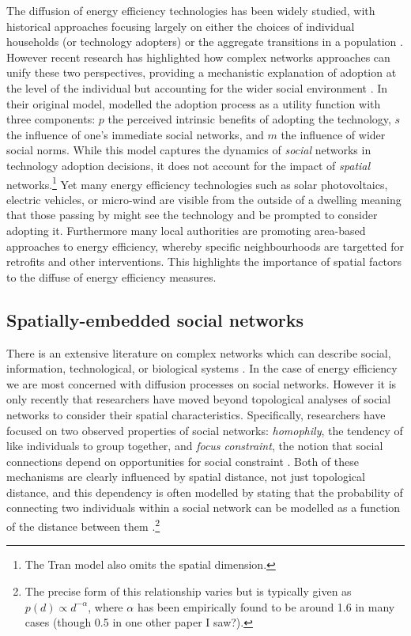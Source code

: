\documentclass{jk-article}
\begin{document}
The diffusion of energy efficiency technologies has been widely studied, with historical approaches focusing largely on either the choices of individual households (or technology adopters) \cite[e.g][]{Labay_Kinnear_1981, Wustenhagen_Markard_Truffer_2003, Baker_2012} or the aggregate transitions in a population \cite[e.g.][]{Rogers_2003, Fouquet_2010}.  However recent research has highlighted how complex networks approaches can unify these two perspectives, providing a mechanistic explanation of adoption at the level of the individual but accounting for the wider social environment \cite{McCullen_et_al_2013, Tran_2012}.  
In their original model, \cite{McCullen_et_al_2013} modelled the adoption process as a utility function with three components: $p$ the perceived intrinsic benefits of adopting the technology, $s$ the influence of one's immediate social networks, and $m$ the influence of wider social norms.  While this model captures the dynamics of \emph{social} networks in technology adoption decisions, it does not account for the impact of \emph{spatial} networks.\footnote{The Tran model also omits the spatial dimension.}  Yet many energy efficiency technologies such as solar photovoltaics, electric vehicles, or micro-wind are visible from the outside of a dwelling meaning that those passing by might see the technology and be prompted to consider adopting it.  Furthermore many local authorities are promoting area-based approaches to energy efficiency, whereby specific neighbourhoods are targetted for retrofits and other interventions.  This highlights the importance of spatial factors to the diffuse of energy efficiency measures.

\subsection{Spatially-embedded social networks}
There is an extensive literature on complex networks which can describe social, information, technological, or biological systems \cite[see][for a review]{Newman_2003}.  In the case of energy efficiency we are most concerned with diffusion processes on social networks.  However it is only recently that researchers have moved beyond topological analyses of social networks to consider their spatial characteristics.  Specifically, researchers have focused on two observed properties of social networks: \emph{homophily}, the tendency of like individuals to group together, and \emph{focus constraint}, the notion that social connections depend on opportunities for social constraint \cite{Expert_Evans_Blondel_Lambiotte_2011}.  Both of these mechanisms are clearly influenced by spatial distance, not just topological distance, and this dependency is often modelled by stating that the probability of connecting two individuals within a social network can be modelled as a function of the distance between them \cite{Barthelemy_2011, Kosmidis_Havlin_Bunde_2008, Wong_Pattison_Robins_2006}.\footnote{The precise form of this relationship varies but is typically given as $p(d) \propto d^{-\alpha}$, where $\alpha$ has been empirically found to be around 1.6 in many cases (though 0.5 in one other paper I saw?).}
\end{document}
